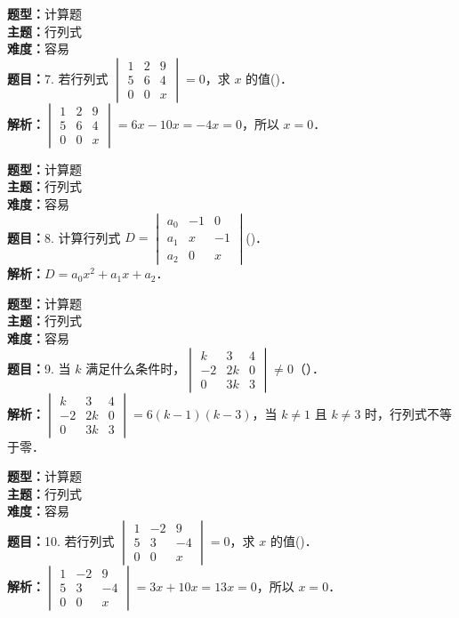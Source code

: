 \documentclass{ctexart}
\newenvironment{question}[5]{%
	\noindent\textbf{题型：}#1\\
	\textbf{主题：}#2\\
	\textbf{难度：}#3\\
	\textbf{题目：}#4\\
	\textbf{解析：}#5\\
	\vspace{1em}
}{}
\begin{document}
	\begin{question} 
		{计算题} 
		{行列式}
		{容易}
		{7. 若行列式 \(\begin{vmatrix} 1 & 2 & 9 \\ 5 & 6 & 4 \\ 0 & 0 & x\end{vmatrix}=0\)，求 \(x\) 的值(\qquad)．}
		{\(\begin{vmatrix} 1 & 2 & 9 \\ 5 & 6 & 4 \\ 0 & 0 & x\end{vmatrix}=6x - 10x = -4x=0\)，所以 \(x=0\)．}
	\end{question}
	
	\begin{question} 
		{计算题} 
		{行列式}
		{容易}
		{8. 计算行列式 \(D=\begin{vmatrix} a_0 & -1 & 0 \\ a_1 & x & -1 \\ a_2 & 0 & x\end{vmatrix}\)(\qquad)．}
		{\(D = a_0 x^2 + a_1 x + a_2\)．}
	\end{question}
	
	\begin{question} 
		{计算题} 
		{行列式}
		{容易}
		{9. 当 \(k\) 满足什么条件时，\(\begin{vmatrix} k & 3 & 4 \\ -2 & 2k & 0 \\ 0 & 3k & 3\end{vmatrix} \neq 0\)（）．}
		{\(\begin{vmatrix} k & 3 & 4 \\ -2 & 2k & 0 \\ 0 & 3k & 3\end{vmatrix}=6(k-1)(k-3)\)，当 \(k \neq 1\) 且 \(k \neq 3\) 时，行列式不等于零．}
	\end{question}
	
	\begin{question} 
		{计算题} 
		{行列式}
		{容易}
		{10. 若行列式 \(\begin{vmatrix} 1 & -2 & 9 \\ 5 & 3 & -4 \\ 0 & 0 & x\end{vmatrix}=0\)，求 \(x\) 的值(\qquad)．}
		{\(\begin{vmatrix} 1 & -2 & 9 \\ 5 & 3 & -4 \\ 0 & 0 & x\end{vmatrix} = 3x + 10x = 13x = 0\)，所以 \(x=0\)．}
	\end{question}
	
\end{document}
